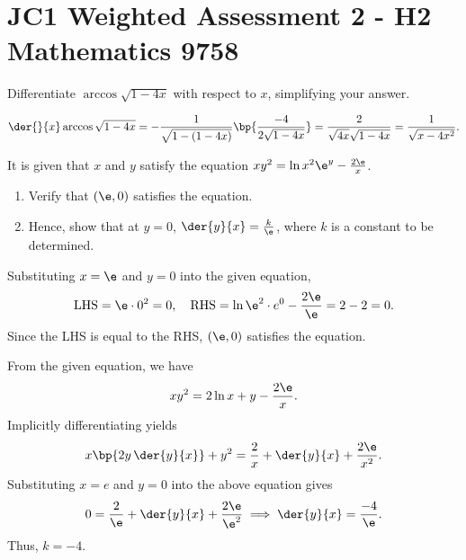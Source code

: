 \section{JC1 Weighted Assessment 2 - H2 Mathematics 9758}

\begin{problem}
    Differentiate $\arccos{\sqrt{1 - 4x}}$ with respect to $x$, simplifying your answer.
\end{problem}
\begin{solution}
    \[\der{}{x} \arccos{\sqrt{1 - 4x}} = -\frac1{\sqrt{1 - (1 - 4x)}} \bp{\frac{-4}{2\sqrt{1 - 4x}}} = \frac2{\sqrt{4x} \sqrt{1 - 4x}} = \frac1{\sqrt{x - 4x^2}}.\]
\end{solution}

\begin{problem}
    It is given that $x$ and $y$ satisfy the equation $xy^2 = \ln{x^2 \e^y} - \frac{2\e}{x}$.
    \begin{enumerate}
        \item Verify that $(\e, 0)$ satisfies the equation.
        \item Hence, show that at $y = 0$, $\der{y}{x} = \frac{k}{\e}$, where $k$ is a constant to be determined.
    \end{enumerate}
\end{problem}
\begin{solution}
    \begin{ppart}
        Substituting $x = \e$ and $y = 0$ into the given equation, \[\text{LHS} = \e \cdot 0^2 = 0, \quad \text{RHS} = \ln{\e^2 \cdot e^0} - \frac{2\e}{\e} = 2 - 2 = 0.\] Since the LHS is equal to the RHS, $(\e, 0)$ satisfies the equation.
    \end{ppart}
    \begin{ppart}
        From the given equation, we have \[xy^2 = 2\ln x + y - \frac{2\e}{x}.\] Implicitly differentiating yields \[x \bp{2y \, \der{y}{x}} + y^2 = \frac2{x} + \der{y}{x} + \frac{2\e}{x^2}.\] Substituting $x = e$ and $y = 0$ into the above equation gives \[0 = \frac2{\e} + \der{y}{x} + \frac{2\e}{\e^2} \implies \der{y}{x} = \frac{-4}{\e}.\] Thus, $k = -4$.
    \end{ppart}
\end{solution}

